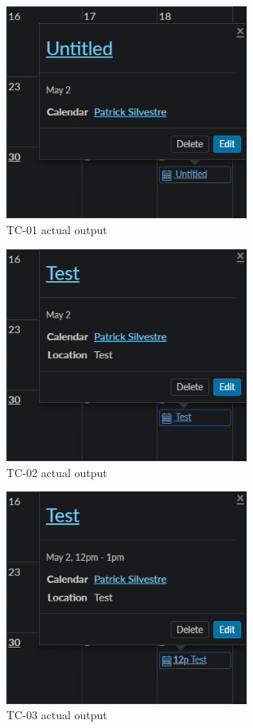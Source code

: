 \documentclass[10pt,letterpaper]{article}
\begin{document}
\newpage
\begin{figure}[h!]
	\centerline{\includegraphics[width=8cm]{screenshots/tc01-actual-output.png}}
	\caption{TC-01 actual output}
\end{figure}
\begin{figure}[h!]
	\centerline{\includegraphics[width=8cm]{screenshots/tc02-actual-output.png}}
	\caption{TC-02 actual output}
\end{figure}
\begin{figure}[h!]
	\centerline{\includegraphics[width=8cm]{screenshots/tc03-actual-output.png}}
	\caption{TC-03 actual output}
\end{figure}
\end{document}
